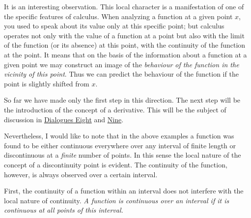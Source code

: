 {\athr It is an interesting observation. This local character is a manifestation of one of the specific features of calculus. When analyzing a function at a given point $x$, you used to speak about its value only at this specific point; but calculus operates not only with the value of a function at a point but also with the limit of the function (or its absence) at this point, with the continuity of the function at the point. It means that on the basis of the information about a function at a given point we may construct an image of the \emph{behaviour of the function in the vicinity of this point}. Thus we can predict the behaviour of the function if the point is slightly shifted from $x$.

So far we have made only the first step in this direction. The next step will be the introduction of the concept of a derivative. This will be the subject of discussion in \hyperref[velocity]{Dialogues Eight} and \hyperref[derivative]{Nine}.

\rdr Nevertheless, I would like to note that in the above examples a function was found to be either continuous everywhere over any interval of finite length or discontinuous at a \emph{finite} number of points. In this sense the local nature of the concept of a discontinuity point is evident. The continuity of the function, however, is always observed over a certain interval.

\athr First, the continuity of a function within an interval does not interfere with the local nature of continuity. \emph{A function is continuous over an interval if it is continuous at all points of this interval.}

}
